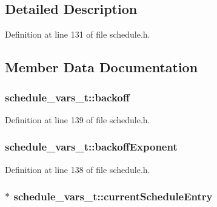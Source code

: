 \subsection{Detailed Description}


Definition at line 131 of file schedule.\+h.



\subsection{Member Data Documentation}
\subsubsection[{\texorpdfstring{backoff}{backoff}}]{ schedule\+\_\+vars\+\_\+t\+::backoff}\hypertarget{structschedule__vars__t_aef135d552e6640d22fdc5315c9c17983}{}\label{structschedule__vars__t_aef135d552e6640d22fdc5315c9c17983}


Definition at line 139 of file schedule.\+h.

\subsubsection[{\texorpdfstring{backoff\+Exponent}{backoffExponent}}]{ schedule\+\_\+vars\+\_\+t\+::backoff\+Exponent}\hypertarget{structschedule__vars__t_aaef939536fcb09d07535d0209a512fad}{}\label{structschedule__vars__t_aaef939536fcb09d07535d0209a512fad}


Definition at line 138 of file schedule.\+h.

\subsubsection[{\texorpdfstring{current\+Schedule\+Entry}{currentScheduleEntry}}]{$\ast$ schedule\+\_\+vars\+\_\+t\+::current\+Schedule\+Entry}\hypertarget{structschedule__vars__t_a8a63d21af04805a20c4361f58b809d51}{}\label{structschedule__vars__t_a8a63d21af04805a20c4361f58b809d51}


